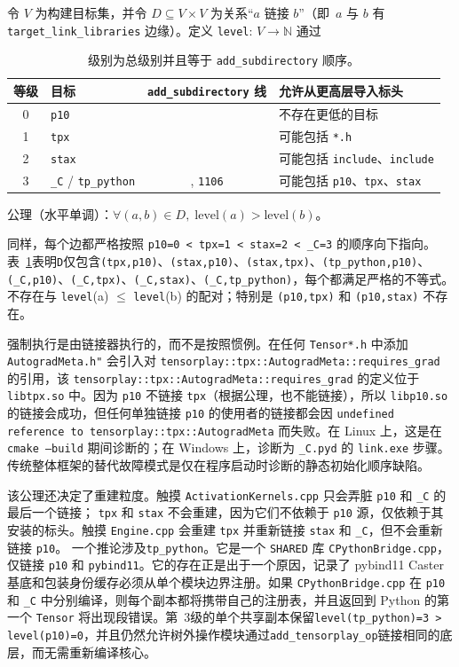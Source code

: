 令 $V$ 为构建目标集，并令 $D\subseteq V\times V$ 为关系“$a$ 链接 $b$”（即\ $a$ 与 $b$ 有 \texttt{target\_link\_libraries} 边缘）。定义 \texttt{level}: $V\rightarrow \mathbb{N}$ 通过

\begin{table}[H]
\centering
\caption{级别为总级别并且等于 \texttt{add\_subdirectory} 顺序。}
\label{tab:levels}
\small
\begin{tabular}{clcl}
\toprule
等级 & 目标 & \texttt{add\_subdirectory} 线 & 允许从更高层导入标头 \\
\midrule
0 & \texttt{p10} &  & 不存在更低的目标 \\
1 & \texttt{tpx} &  & 可能包括 \texttt{*.h} \\
2 & \texttt{stax} &  & 可能包括 \texttt{include}、\texttt{include} \\
3 & \texttt{\_C} / \texttt{tp\_python} & , \texttt{1106} & 可能包括 \texttt{p10}、\texttt{tpx}、\texttt{stax} \\
\bottomrule
\end{tabular}
\end{table}

公理（水平单调）：$\forall (a,b)\in D,\; \mathrm{level}(a) > \mathrm{level}(b)$。

同样，每个边都严格按照 \texttt{p10=0 < tpx=1 < stax=2 < \_C=3} 的顺序向下指向。表~\ref{tab:levels}表明\texttt{D}仅包含\texttt{(tpx,p10)}、\texttt{(stax,p10)}、\texttt{(stax,tpx)}、\texttt{(tp\_python,p10)}、\texttt{(\_C,p10)}、\texttt{(\_C,tpx)}、\texttt{(\_C,stax)}、\texttt{(\_C,tp\_python)}，每个都满足严格的不等式。不存在与 \texttt{level}(a) $\le$ \texttt{level}(b) 的配对；特别是 \texttt{(p10,tpx)} 和 \texttt{(p10,stax)} 不存在。

强制执行是由链接器执行的，而不是按照惯例。在任何 \texttt{Tensor*.h} 中添加 \texttt{AutogradMeta.h"} 会引入对 \texttt{tensorplay::tpx::AutogradMeta::requires\_grad} 的引用，该 \texttt{tensorplay::tpx::AutogradMeta::requires\_grad} 的定义位于 \texttt{libtpx.so} 中。因为 \texttt{p10} 不链接 \texttt{tpx}（根据公理，也不能链接），所以 \texttt{libp10.so} 的链接会成功，但任何单独链接 \texttt{p10} 的使用者的链接都会因 \texttt{undefined reference to tensorplay::tpx::AutogradMeta} 而失败。在 Linux 上，这是在 \texttt{cmake --build} 期间诊断的；在 Windows 上，诊断为 \texttt{\_C.pyd} 的 \texttt{link.exe} 步骤。传统整体框架的替代故障模式是仅在程序启动时诊断的静态初始化顺序缺陷。

该公理还决定了重建粒度。触摸 \texttt{ActivationKernels.cpp} 只会弄脏 \texttt{p10} 和 \texttt{\_C} 的最后一个链接； \texttt{tpx} 和 \texttt{stax} 不会重建，因为它们不依赖于 \texttt{p10} 源，仅依赖于其安装的标头。触摸 \texttt{Engine.cpp} 会重建 \texttt{tpx} 并重新链接 \texttt{stax} 和 \texttt{\_C}，但不会重新链接 \texttt{p10}。 
一个推论涉及\texttt{tp\_python}。它是一个 \texttt{SHARED} 库 \texttt{CPythonBridge.cpp}，仅链接 \texttt{p10} 和 \texttt{pybind11}。它的存在正是出于一个原因，记录了 pybind11 Caster 基底和包装身份缓存必须从单个模块边界注册。如果 \texttt{CPythonBridge.cpp} 在 \texttt{p10} 和 \texttt{\_C} 中分别编译，则每个副本都将携带自己的注册表，并且返回到 Python 的第一个 \texttt{Tensor} 将出现段错误。第~3级的单个共享副本保留\texttt{level(tp\_python)=3 > level(p10)=0}，并且仍然允许树外操作模块通过\texttt{add\_tensorplay\_op}链接相同的底层，而无需重新编译核心。

